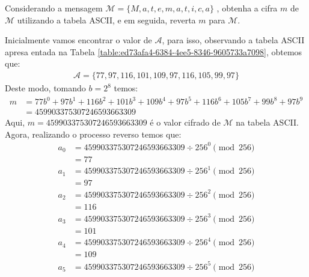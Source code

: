 \begin{exemplo} \label{exemplo:8a0f7616-e746-4717-a850-086812c035da}
	Considerando a mensagem $\mathcal{M} = \{M, a, t, e, m, a, t, i, c, a\} $ , obtenha a cifra $m$ de $\mathcal{M}$ utilizando a tabela ASCII, e em seguida, reverta $m$ para $\mathcal{M} $.

	Inicialmente vamos encontrar o valor de $\mathcal{A} $, para isso, observando a
	tabela ASCII apresa entada na Tabela
	\ref{table:ed73afa4-6384-4ee5-8346-9605733a7098}, obtemos que:
	\begin{align}
		\mathcal{A} = \{ 77, 97, 116, 101, 109, 97, 116, 105, 99, 97\}  \nonumber
	\end{align}
	Deste modo, tomando $b = 2^8$ temos:
	\begin{align}
		m & =  77b^{0} + 97b^{1} + 116 b^{2} + 101b^{3} + 109 b^{4} + 97b^{5} + 116b^{6} + 105 b^{7} + 99b^{8} + 97b^{9}  \nonumber \\
		  & = 459903375307246593663309 \nonumber
	\end{align}
	Aqui, $m = 459903375307246593663309$  é o valor cifrado de $\mathcal{M} $ na tabela ASCII.
	\justify
	Agora, realizando o processo reverso temos que:
	\begin{align}
		a_0 & = 459903375307246593663309 \div 256^{0} \pmod {256}  \nonumber \\
		    & = 77 \nonumber
	\end{align}
	\begin{align}
		a_1 & = 459903375307246593663309 \div 256^{1} \pmod {256}  \nonumber \\
		    & = 97 \nonumber
	\end{align}
	\begin{align}
		a_2 & = 459903375307246593663309 \div 256^{2} \pmod {256}  \nonumber \\
		    & = 116 \nonumber
	\end{align}
	\begin{align}
		a_3 & = 459903375307246593663309 \div 256^{3} \pmod {256}  \nonumber \\
		    & = 101 \nonumber
	\end{align}
	\begin{align}
		a_4 & = 459903375307246593663309 \div 256^{4} \pmod {256}  \nonumber \\
		    & = 109 \nonumber
	\end{align}
	\begin{align}
		a_5 & = 459903375307246593663309 \div 256^{5} \pmod {256}  \nonumber \\

\end{align}
\end{exemplo}
